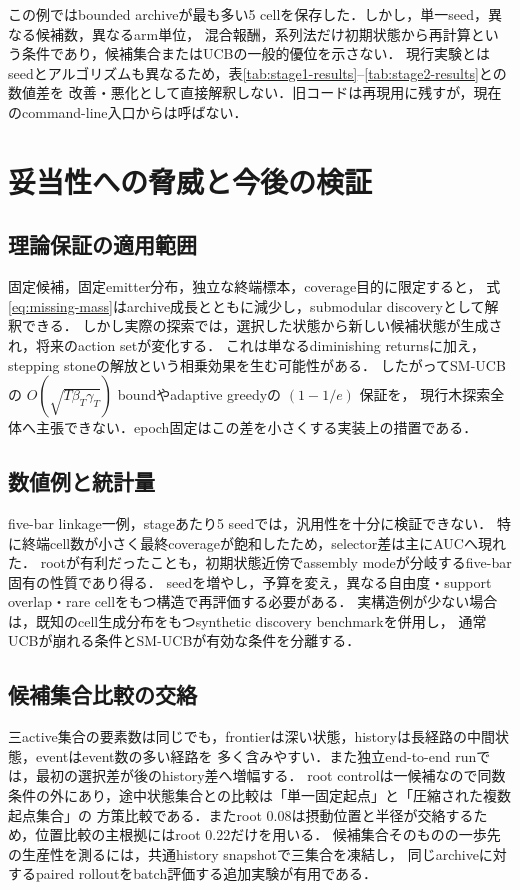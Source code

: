 \documentclass[a4paper,11pt]{ltjsarticle}
\begin{document}
この例ではbounded archiveが最も多い5 cellを保存した．しかし，単一seed，異なる候補数，異なるarm単位，
混合報酬，系列法だけ初期状態から再計算という条件であり，候補集合またはUCBの一般的優位を示さない．
現行実験とはseedとアルゴリズムも異なるため，表\ref{tab:stage1-results}--\ref{tab:stage2-results}との数値差を
改善・悪化として直接解釈しない．旧コードは再現用に残すが，現在のcommand-line入口からは呼ばない．

\section{妥当性への脅威と今後の検証}
\label{sec:limitations}

\subsection{理論保証の適用範囲}

固定候補，固定emitter分布，独立な終端標本，coverage目的に限定すると，
式\eqref{eq:missing-mass}はarchive成長とともに減少し，submodular discoveryとして解釈できる．
しかし実際の探索では，選択した状態から新しい候補状態が生成され，将来のaction setが変化する．
これは単なるdiminishing returnsに加え，stepping stoneの解放という相乗効果を生む可能性がある．
したがってSM-UCBの \(O(\sqrt{T\beta_T\gamma_T})\) boundやadaptive greedyの \((1-1/e)\) 保証を，
現行木探索全体へ主張できない．epoch固定はこの差を小さくする実装上の措置である．

\subsection{数値例と統計量}

five-bar linkage一例，stageあたり5 seedでは，汎用性を十分に検証できない．
特に終端cell数が小さく最終coverageが飽和したため，selector差は主にAUCへ現れた．
rootが有利だったことも，初期状態近傍でassembly modeが分岐するfive-bar固有の性質であり得る．
seedを増やし，予算を変え，異なる自由度・support overlap・rare cellをもつ構造で再評価する必要がある．
実構造例が少ない場合は，既知のcell生成分布をもつsynthetic discovery benchmarkを併用し，
通常UCBが崩れる条件とSM-UCBが有効な条件を分離する．

\subsection{候補集合比較の交絡}

三active集合の要素数は同じでも，frontierは深い状態，historyは長経路の中間状態，eventはevent数の多い経路を
多く含みやすい．また独立end-to-end runでは，最初の選択差が後のhistory差へ増幅する．
root controlは一候補なので同数条件の外にあり，途中状態集合との比較は「単一固定起点」と「圧縮された複数起点集合」の
方策比較である．またroot 0.08は摂動位置と半径が交絡するため，位置比較の主根拠にはroot 0.22だけを用いる．
候補集合そのものの一歩先の生産性を測るには，共通history snapshotで三集合を凍結し，
同じarchiveに対するpaired rolloutをbatch評価する追加実験が有用である．
\end{document}
